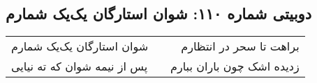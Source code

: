 \begin{center}
\section*{دوبیتی شماره ۱۱۰: شوان استارگان یک‌یک شمارم}
\label{sec:110}
\begin{longtable}{l p{0.5cm} r}
شوان استارگان یک‌یک شمارم
&&
براهت تا سحر در انتظارم
\\
پس از نیمه شوان که ته نیایی
&&
زدیده اشک چون باران ببارم
\\
\end{longtable}
\end{center}
